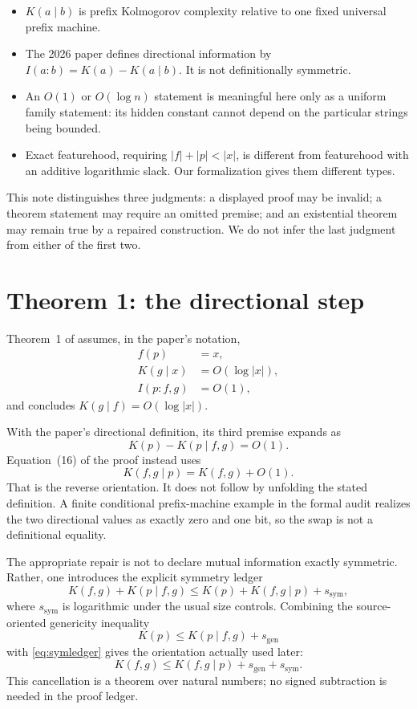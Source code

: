 \documentclass[11pt]{article}
\newcommand{\bits}[1]{\lvert #1\rvert}
\newcommand{\K}{K}
\begin{document}
\begin{itemize}
  \item $\K(a\mid b)$ is prefix Kolmogorov complexity relative to one fixed
        universal prefix machine.
  \item The 2026 paper defines directional information by
        $I(a:b)=\K(a)-\K(a\mid b)$.  It is not definitionally symmetric.
  \item An $O(1)$ or $O(\log n)$ statement is meaningful here only as a
        uniform family statement: its hidden constant cannot depend on the
        particular strings being bounded.
  \item Exact featurehood, requiring
        $\bits f+\bits p<\bits x$, is different from featurehood with an
        additive logarithmic slack.  Our formalization gives them different
        types.
\end{itemize}

This note distinguishes three judgments: a displayed proof may be invalid; a
theorem statement may require an omitted premise; and an existential theorem
may remain true by a repaired construction.  We do not infer the last judgment
from either of the first two.

\section{Theorem 1: the directional step}

Theorem~1 of \cite{franz2026} assumes, in the paper's notation,
\begin{align}
  f(p)&=x,\\
  \K(g\mid x)&=O(\log\bits x),\\
  I(p:f,g)&=O(1),
\end{align}
and concludes $\K(g\mid f)=O(\log\bits x)$.

With the paper's directional definition, its third premise expands as
\[
  \K(p)-\K(p\mid f,g)=O(1).
\]
Equation~(16) of the proof instead uses
\[
  \K(f,g\mid p)=\K(f,g)+O(1).
\]
That is the reverse orientation.  It does not follow by unfolding the stated
definition.  A finite conditional prefix-machine example in the formal audit
realizes the two directional values as exactly zero and one bit, so the swap is
not a definitional equality.

The appropriate repair is not to declare mutual information exactly
symmetric.  Rather, one introduces the explicit symmetry ledger
\begin{equation}
  \K(f,g)+\K(p\mid f,g)
  \leq
  \K(p)+\K(f,g\mid p)+s_{\mathrm{sym}},
  \label{eq:symledger}
\end{equation}
where $s_{\mathrm{sym}}$ is logarithmic under the usual size controls.
Combining the source-oriented genericity inequality
\[
  \K(p)\leq\K(p\mid f,g)+s_{\mathrm{gen}}
\]
with \eqref{eq:symledger} gives the orientation actually used later:
\[
  \K(f,g)\leq\K(f,g\mid p)+s_{\mathrm{gen}}+s_{\mathrm{sym}}.
\]
This cancellation is a theorem over natural numbers; no signed subtraction is
needed in the proof ledger.
\end{document}
